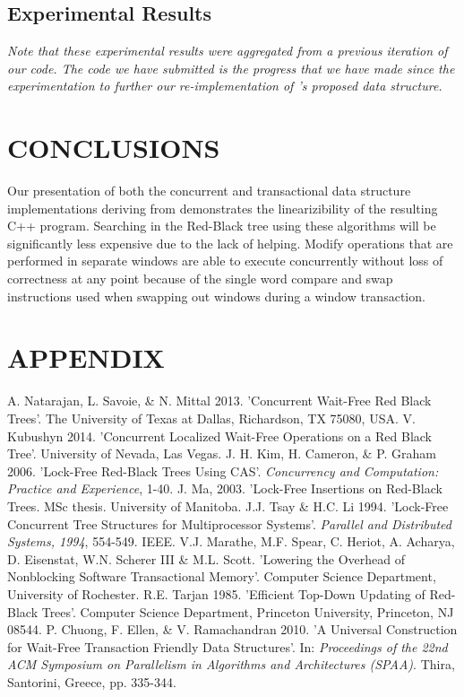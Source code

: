 \documentclass[letterpaper, 10 pt, conference]{ieeeconf}
\begin{document}
\subsection{Experimental Results}
\textit{Note that these experimental results were aggregated from a previous iteration of our code. The code we have submitted is the progress that we have made since the experimentation to further our re-implementation of \cite{c1}'s proposed data structure.}

	\section{CONCLUSIONS}
	
	Our presentation of both the concurrent and transactional data structure implementations deriving from \cite{c1} demonstrates the linearizibility of the resulting C++ program. Searching in the Red-Black tree using these algorithms will be significantly less expensive due to the lack of helping. Modify operations that are performed in separate windows are able to execute concurrently without loss of correctness at any point because of the single word compare and swap instructions used when swapping out windows during a window transaction.

	\section*{APPENDIX}
	
	\begin{thebibliography}{99}
		
		 A. Natarajan, L. Savoie, \& N. Mittal 2013. 'Concurrent Wait-Free Red Black Trees'. The University of Texas at Dallas, Richardson, TX 75080, USA.
		 V. Kubushyn 2014. 'Concurrent Localized Wait-Free Operations on a Red Black Tree'. University of Nevada, Las Vegas.
		 J. H. Kim, H. Cameron, \& P. Graham 2006. 'Lock-Free Red-Black Trees Using CAS'. \textit{Concurrency and Computation: Practice and Experience}, 1-40.
		 J. Ma, 2003. 'Lock-Free Insertions on Red-Black Trees. MSc thesis. University of Manitoba.
		 J.J. Tsay \& H.C. Li 1994. 'Lock-Free Concurrent Tree Structures for Multiprocessor Systems'. \textit{Parallel and Distributed Systems, 1994}, 554-549. IEEE.
		 V.J. Marathe, M.F. Spear, C. Heriot, A. Acharya, D. Eisenstat, W.N. Scherer III \& M.L. Scott. 'Lowering the Overhead of Nonblocking Software Transactional Memory'. Computer Science Department, University of Rochester.
		 R.E. Tarjan 1985. 'Efficient Top-Down Updating of Red-Black Trees'. Computer Science Department, Princeton University, Princeton, NJ 08544. 
		 P. Chuong, F. Ellen, \& V. Ramachandran 2010. 'A Universal Construction for Wait-Free Transaction Friendly Data Structures'. In: \textit{Proceedings of the 22nd ACM Symposium on Parallelism in Algorithms and Architectures (SPAA)}. Thira, Santorini, Greece, pp. 335-344.
				
	\end{thebibliography}
	
	
	
	
\end{document}
